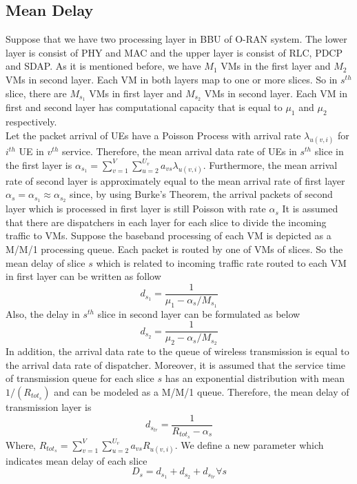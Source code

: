 \documentclass[conference]{IEEEtran}
\begin{document}
\subsection{Mean Delay}
Suppose that we have two processing layer in BBU of O-RAN system. The lower layer is consist of PHY and MAC and the upper layer is consist of RLC, PDCP and SDAP.\newline   
As it is mentioned before, we have $M_1$ VMs in the first layer and $M_2$ VMs in second layer. Each VM in both layers map to one or more slices. So in $s^{th}$ slice, there are $M_{s_1}$ VMs in first layer and $M_{s_2}$ VMs in second layer. Each VM in first and second layer has computational capacity that is  equal to $\mu_1$ and $\mu_2$ respectively. \\
Let the packet arrival of UEs have a Poisson Process with arrival rate $\lambda_{u(v,i)}$ for $i^{th}$ UE in $v^{th}$ service. 
Therefore, the mean arrival data rate of UEs in $s^{th}$ slice in the first layer is 
$\alpha_{s_1} = \sum_{v=1}^{V}\sum_{u=2}^{U_v}a_{vs}\lambda_{u(v,i)}$.  
Furthermore, the mean arrival rate of second layer is approximately equal to the mean arrival rate of first layer $\alpha_{s} =\alpha_{s_1} \approx \alpha_{s_2}$ since, by using Burke’s Theorem, the arrival packets of second layer which is processed in first layer is still Poisson with rate $\alpha_{s}$  
It is assumed that there are dispatchers in each layer for each slice to divide the incoming traffic to VMs.
Suppose the baseband processing of each VM is depicted as a M/M/1 processing queue.
Each packet is routed by one of VMs of slices. So the mean delay of slice $s$ which is related to incoming traffic rate routed to
each VM in first layer can be written as follow
\begin{equation}
d_{s_1} = \frac{1}{\mu_1 - \alpha_{s}/{M_{s_1}}}
\end{equation}
Also, the delay in $s^{th}$ slice in second layer can be formulated as below
\begin{equation}
d_{s_2} = \frac{1}{\mu_2 - \alpha_{s}/{M_{s_2}}}
\end{equation}
In addition, the arrival data rate to the queue of wireless transmission
 is equal to the arrival data rate of dispatcher.
Moreover, it is assumed that the service time of transmission queue for each slice $s$ has 
 an exponential distribution with mean $1/(R_{{tot}_s})$ and can be modeled as a M/M/1 queue. Therefore, 
the mean delay of transmission layer is 
\begin{equation}
d_{s_{tr}} = \frac{1}{R_{{tot}_s} - \alpha_{s}}
\end{equation}
Where, $R_{{tot}_s} =  \sum_{v=1}^{V}\sum_{u=2}^{U_v}a_{vs}R_{u(v,i)}$.
We define a new parameter which indicates mean delay of each slice
\begin{equation}
D_{s} = d_{s_1} + d_{s_2} + d_{s_{tr}} \forall s
\end{equation} 
\end{document}
